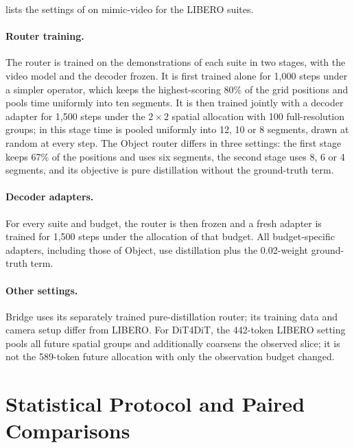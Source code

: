 

 lists the settings of \method on mimic-video for the LIBERO suites.

\paragraph{Router training.}
The router is trained on the demonstrations of each suite in two stages, with the video model and the decoder frozen.
It is first trained alone for 1,000 steps under a simpler operator, which keeps the highest-scoring 80\% of the grid positions and pools time uniformly into ten segments.
It is then trained jointly with a decoder adapter for 1,500 steps under the $2{\times}2$ spatial allocation with 100 full-resolution groups; in this stage time is pooled uniformly into 12, 10 or 8 segments, drawn at random at every step.
The Object router differs in three settings: the first stage keeps 67\% of the positions and uses six segments, the second stage uses 8, 6 or 4 segments, and its objective is pure distillation without the ground-truth term.

\paragraph{Decoder adapters.}
For every suite and budget, the router is then frozen and a fresh adapter is trained for 1,500 steps under the allocation of that budget.
All budget-specific adapters, including those of Object, use distillation plus the 0.02-weight ground-truth term.

\paragraph{Other settings.}
Bridge uses its separately trained pure-distillation router; its training data and camera setup differ from LIBERO.
For DiT4DiT, the 442-token LIBERO setting pools all future spatial groups and additionally coarsens the observed slice; it is not the 589-token future allocation with only the observation budget changed.

\section{Statistical Protocol and Paired Comparisons}
\label{sec:supp_stats}




